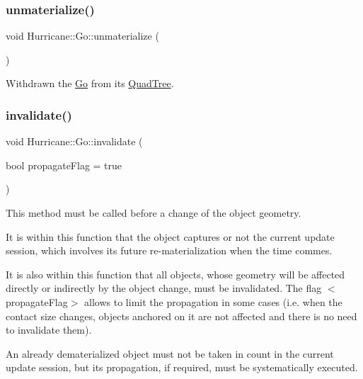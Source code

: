 \subsubsection{\texorpdfstring{unmaterialize()}{unmaterialize()}}
{\footnotesize\ttfamily void Hurricane\+::\+Go\+::unmaterialize (\begin{DoxyParamCaption}{ }\end{DoxyParamCaption})\hspace{0.3cm}{\ttfamily [pure virtual]}}

Withdrawn the \mbox{\hyperlink{classHurricane_1_1Go}{Go}} from it\textquotesingle{}s \mbox{\hyperlink{classHurricane_1_1QuadTree}{Quad\+Tree}}. \mbox{\label{classHurricane_1_1Go_a5ee451e118fe8cace16989c0f3a6d855}} 
\subsubsection{\texorpdfstring{invalidate()}{invalidate()}}
{\footnotesize\ttfamily void Hurricane\+::\+Go\+::invalidate (\begin{DoxyParamCaption}\item[{bool}]{propagate\+Flag = {\ttfamily true} }\end{DoxyParamCaption})\hspace{0.3cm}{\ttfamily [virtual]}}

This method must be called before a change of the object geometry.

It is within this function that the object captures or not the current update session, which involves its future re-\/materialization when the time commes.

It is also within this function that all objects, whose geometry will be affected directly or indirectly by the object change, must be invalidated. The flag {\ttfamily $<$propagate\+Flag$>$} allows to limit the propagation in some cases (i.\+e. when the contact size changes, objects anchored on it are not affected and there is no need to invalidate them).

An already dematerialized object must not be taken in count in the current update session, but its propagation, if required, must be systematically executed.

